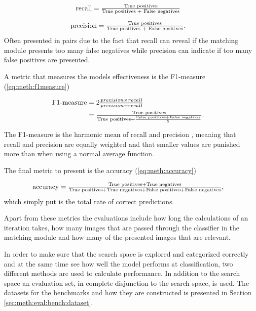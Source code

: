 \begin{equation}
\label{eq:meth:recall}
\textnormal{recall} = \tfrac{\textnormal{True positives}}{\textnormal{True positives } + \textnormal{ False negatives}}
\end{equation}

\begin{equation}
\label{eq:meth:precision}
\textnormal{precision} = \tfrac{\textnormal{True positives}}{\textnormal{True positives } + \textnormal{ False positives}}.
\end{equation}
Often presented in pairs due to the fact that recall can reveal if the matching module presents too many false negatives while precision can indicate if too many false positives are presented. 

A metric that measures the models effectiveness is the F1-measure (\ref{eq:meth:f1measure})

\begin{equation}
\label{eq:meth:f1measure}
\begin{split}
\textnormal{F1-measure} &= 2 \tfrac{precision \times recall}{precision + recall}\\
&= \tfrac{\textnormal{True positives}}{\textnormal{True positives} +\frac{\textnormal{False positives}+\textnormal{False negatives}}{2}}.
\end{split}
\end{equation}

The F1-measure is the harmonic mean of recall and precision \cite{powers2011evaluation}, meaning that recall and precision are equally weighted and that smaller values are punished more than when using a normal average function. 

The final metric to present is the accuracy (\ref{eq:meth:accuracy}) 

\begin{equation}
\label{eq:meth:accuracy}
\textnormal{accuracy} = \tfrac{\textnormal{True positives} + \textnormal{True negatives}}{\textnormal{True positives} + \textnormal{True negatives}+ \textnormal{False positives} + \textnormal{False negatives}},
\end{equation}
which simply put is the total rate of correct predictions. 


Apart from these metrics the evaluations include how long the calculations of an iteration takes, how many images that are passed through the classifier in the matching module and how many of the presented images that are relevant.   

In order to make sure that the search space is explored and categorized correctly and at the same time see how well the model performs at classification, two different methods are used to calculate performance. In addition to the search space an evaluation set, in complete disjunction to the search space, is used. The datasets for the benchmarks and how they are constructed is presented in Section \ref{sec:meth:eval:bench:dataset}. 

